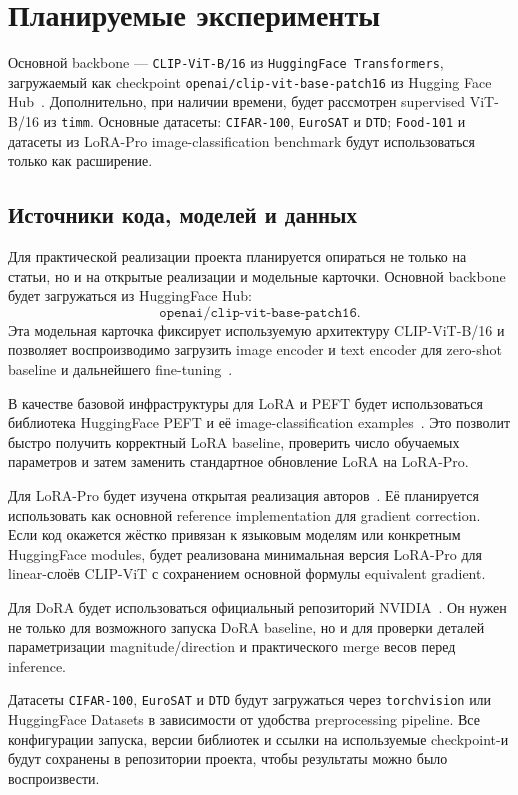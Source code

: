 \documentclass[]{scrartcl}
\begin{document}
\section{Планируемые эксперименты}

Основной backbone --- \texttt{CLIP-ViT-B/16} из \texttt{HuggingFace Transformers}, загружаемый как checkpoint \texttt{openai/clip-vit-base-patch16} из Hugging Face Hub~\cite{huggingfaceclipvit}. Дополнительно, при наличии времени, будет рассмотрен supervised ViT-B/16 из \texttt{timm}. Основные датасеты: \texttt{CIFAR-100}, \texttt{EuroSAT} и \texttt{DTD}; \texttt{Food-101} и датасеты из LoRA-Pro image-classification benchmark будут использоваться только как расширение.

\subsection{Источники кода, моделей и данных}

Для практической реализации проекта планируется опираться не только на статьи, но и на открытые реализации и модельные карточки. Основной backbone будет загружаться из HuggingFace Hub:
\[
    \texttt{openai/clip-vit-base-patch16}.
\]
Эта модельная карточка фиксирует используемую архитектуру CLIP-ViT-B/16 и позволяет воспроизводимо загрузить image encoder и text encoder для zero-shot baseline и дальнейшего fine-tuning~\cite{huggingfaceclipvit}.

В качестве базовой инфраструктуры для LoRA и PEFT будет использоваться библиотека HuggingFace PEFT и её image-classification examples~\cite{huggingfacepeftlora}.
Это позволит быстро получить корректный LoRA baseline, проверить число обучаемых параметров и затем заменить стандартное обновление LoRA на LoRA-Pro.

Для LoRA-Pro будет изучена открытая реализация авторов~\cite{loraprogithub}.
Её планируется использовать как основной reference implementation для gradient correction. Если код окажется жёстко привязан к языковым моделям или конкретным HuggingFace modules, будет реализована минимальная версия LoRA-Pro для linear-слоёв CLIP-ViT с сохранением основной формулы equivalent gradient.

Для DoRA будет использоваться официальный репозиторий NVIDIA~\cite{doragithub}.
Он нужен не только для возможного запуска DoRA baseline, но и для проверки деталей параметризации magnitude/direction и практического merge весов перед inference.

Датасеты \texttt{CIFAR-100}, \texttt{EuroSAT} и \texttt{DTD} будут загружаться через \texttt{torchvision} или HuggingFace Datasets в зависимости от удобства preprocessing pipeline. Все конфигурации запуска, версии библиотек и ссылки на используемые checkpoint-и будут сохранены в репозитории проекта, чтобы результаты можно было воспроизвести.
\end{document}
